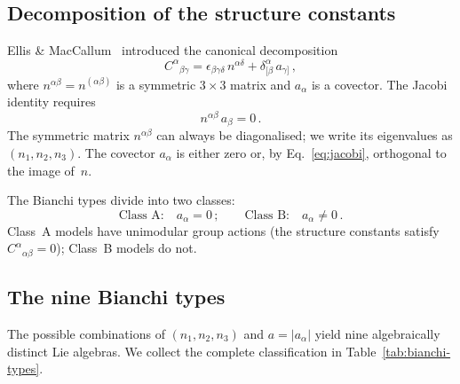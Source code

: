 \subsection{Decomposition of the structure constants}
\label{sec:struct-decomp}

Ellis \& MacCallum~\cite{EllisMacCallum1969} introduced the
canonical decomposition
\begin{equation}\label{eq:struct-constants}
C^{\alpha}{}_{\beta\gamma}
= \epsilon_{\beta\gamma\delta}\,n^{\alpha\delta}
  + \delta^{\alpha}_{[\beta}\,a_{\gamma]}\,,
\end{equation}
where $n^{\alpha\beta} = n^{(\alpha\beta)}$ is a symmetric
$3 \times 3$ matrix and $a_\alpha$ is a covector.  The Jacobi
identity requires
\begin{equation}\label{eq:jacobi}
n^{\alpha\beta}\,a_\beta = 0\,.
\end{equation}
The symmetric matrix $n^{\alpha\beta}$ can always be
diagonalised; we write its eigenvalues as $(n_1, n_2, n_3)$.
The covector $a_\alpha$ is either zero or, by
Eq.~\eqref{eq:jacobi}, orthogonal to the image of~$n$.

The Bianchi types divide into two classes:
\begin{equation}
\text{Class A:}\quad a_\alpha = 0\,;\qquad
\text{Class B:}\quad a_\alpha \neq 0\,.
\end{equation}
Class~A models have unimodular group actions (the structure
constants satisfy $C^\alpha{}_{\alpha\beta} = 0$); Class~B
models do not.


\subsection{The nine Bianchi types}\label{sec:nine-types}

The possible combinations of $(n_1, n_2, n_3)$ and
$a = |a_\alpha|$ yield nine algebraically distinct Lie algebras.
We collect the complete classification in
Table~\ref{tab:bianchi-types}.

